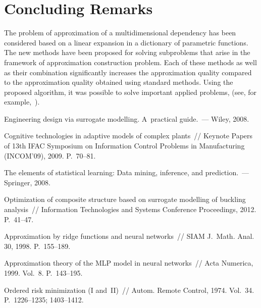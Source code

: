 \begin{multicols}{2}
{  }



\section{Concluding Remarks}

\noindent
The problem of approximation of a multidimensional dependency has been considered
based on a
linear expansion in a dictionary of parametric functions.
The new methods have been proposed for solving subproblems that arise in the framework 
of approximation construction problem.
Each of these methods as well as their combination significantly increases the
approximation quality compared to the approximation quality obtained using standard methods.
Using the proposed algorithm, it was possible to solve important applied problems, 
(see, for example,~\cite{copti}).

{\small\frenchspacing
{%
\begin{thebibliography}{99}


    Engineering design via surrogate modelling. A~practical guide.~---
    Wiley, 2008.

  Cognitive technologies in adaptive models of complex plants~//
  Keynote Papers of 13th IFAC Symposium on Information Control Problems in Manufacturing (INCOM'09),
   2009. P.~70--81.

  The elements of statistical learning: Data mining, inference, and prediction.~---
  Springer, 2008.

 Optimization of composite structure based on surrogate modelling of
   buckling analysis~//
Information Technologies and Systems Conference Proceedings, 2012. P.~41--47.

{Approximation by ridge functions and neural networks}~// 
SIAM J.~Math. Anal. 30, 1998. P.~155--189.

  Approximation theory of the MLP model in neural networks~//
  Acta Numerica, 1999. Vol.~8. P.~143--195.
  

 {Ordered risk minimization (I and~II)}~// 
Autom. Remote Control, 1974. Vol.~34. P.~1226--1235; 1403--1412.


\end{thebibliography}}}
\end{multicols}
